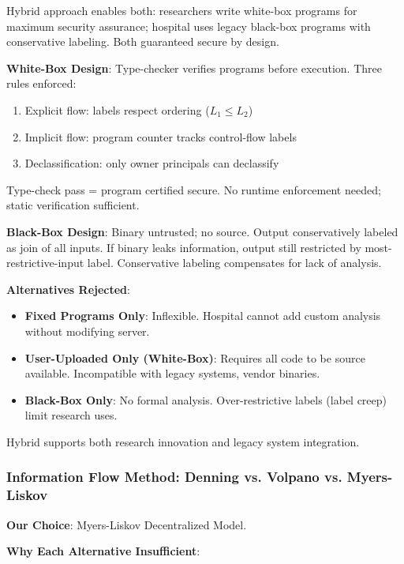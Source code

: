 Hybrid approach enables both: researchers write white-box programs for maximum security assurance; hospital uses legacy black-box programs with conservative labeling. Both guaranteed secure by design.

\textbf{White-Box Design}: Type-checker verifies programs before execution. Three rules enforced:
\begin{enumerate}
\item Explicit flow: labels respect ordering ($L_1 \leq L_2$)
\item Implicit flow: program counter tracks control-flow labels
\item Declassification: only owner principals can declassify
\end{enumerate}

Type-check pass = program certified secure. No runtime enforcement needed; static verification sufficient.

\textbf{Black-Box Design}: Binary untrusted; no source. Output conservatively labeled as join of all inputs. If binary leaks information, output still restricted by most-restrictive-input label. Conservative labeling compensates for lack of analysis.

\textbf{Alternatives Rejected}:
\begin{itemize}
\item \textbf{Fixed Programs Only}: Inflexible. Hospital cannot add custom analysis without modifying server.
\item \textbf{User-Uploaded Only (White-Box)}: Requires all code to be source available. Incompatible with legacy systems, vendor binaries.
\item \textbf{Black-Box Only}: No formal analysis. Over-restrictive labels (label creep) limit research uses.
\end{itemize}

Hybrid supports both research innovation and legacy system integration.

\subsubsection{Information Flow Method: Denning vs. Volpano vs. Myers-Liskov}

\textbf{Our Choice}: Myers-Liskov Decentralized Model.

\textbf{Why Each Alternative Insufficient}:


